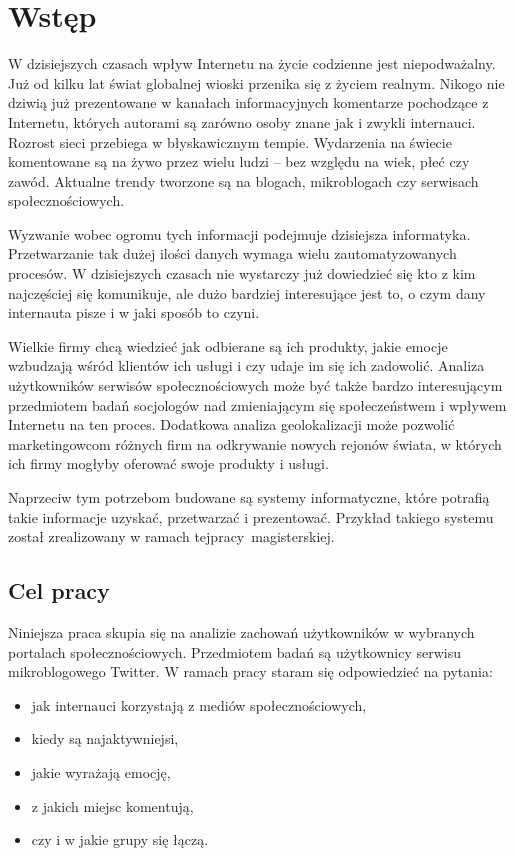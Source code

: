 \chapter{Wstęp}
\label{sec:wstęp}
W dzisiejszych czasach wpływ Internetu na życie codzienne jest niepodważalny.
Już od kilku lat świat globalnej wioski przenika się z życiem realnym.
Nikogo nie dziwią już prezentowane w kanałach informacyjnych komentarze
pochodzące z Internetu, których autorami są zarówno osoby znane jak i zwykli
internauci.  Rozrost sieci przebiega w błyskawicznym tempie.
Wydarzenia na świecie komentowane są na żywo przez wielu ludzi -- bez względu na
wiek, płeć czy zawód. Aktualne trendy tworzone są na blogach, mikroblogach czy
serwisach społecznościowych.

Wyzwanie wobec ogromu tych informacji podejmuje dzisiejsza informatyka.
Przetwarzanie tak dużej ilości danych wymaga wielu zautomatyzowanych procesów.
W dzisiejszych czasach nie wystarczy już dowiedzieć się kto z kim najczęściej
się komunikuje, ale dużo bardziej interesujące jest to, o czym dany internauta
pisze i w jaki sposób to czyni.

Wielkie firmy chcą wiedzieć jak odbierane są ich produkty, jakie emocje
wzbudzają wśród klientów ich usługi i czy udaje im się ich zadowolić.
Analiza użytkowników serwisów społecznościowych może być także bardzo
interesującym przedmiotem badań socjologów nad zmieniającym się społeczeństwem i
wpływem Internetu na ten proces.
Dodatkowa analiza geolokalizacji może pozwolić marketingowcom różnych firm na
odkrywanie nowych rejonów świata, w których ich firmy mogłyby oferować swoje
produkty i usługi.

Naprzeciw tym potrzebom budowane są systemy informatyczne, które potrafią takie
informacje uzyskać, przetwarzać i prezentować. Przykład takiego systemu został
zrealizowany w ramach tej\linebreak pracy~magisterskiej.

\section{Cel pracy}
Niniejsza praca skupia się na analizie zachowań użytkowników w wybranych
portalach społecznościowych. Przedmiotem badań są użytkownicy serwisu
mikroblogowego Twitter. W ramach pracy staram się
odpowiedzieć na pytania:
\begin{itemize}
  \item jak internauci korzystają z mediów społecznościowych,
  \item kiedy są najaktywniejsi,
  \item jakie wyrażają emocję,
  \item z jakich miejsc komentują,
  \item czy i w jakie grupy się łączą.
\end{itemize}

